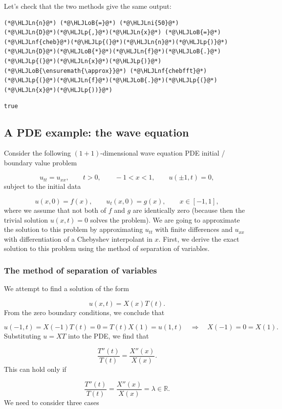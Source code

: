 \documentclass[12pt,a4paper]{article}
\newcommand{\HLJLn}[1]{#1}
\newcommand{\HLJLnf}[1]{\textcolor[RGB]{66,102,213}{#1}}
\newcommand{\HLJLni}[1]{\textcolor[RGB]{59,151,46}{#1}}
\newcommand{\HLJLoB}[1]{\textcolor[RGB]{102,102,102}{\textbf{#1}}}
\newcommand{\HLJLp}[1]{#1}
\begin{document}
Let's check that the two methods give the same output:


\begin{lstlisting}
(*@\HLJLn{n}@*) (*@\HLJLoB{=}@*) (*@\HLJLni{50}@*)
(*@\HLJLn{D}@*)(*@\HLJLp{,}@*)(*@\HLJLn{x}@*) (*@\HLJLoB{=}@*) (*@\HLJLnf{cheb}@*)(*@\HLJLp{(}@*)(*@\HLJLn{n}@*)(*@\HLJLp{)}@*)
(*@\HLJLn{D}@*)(*@\HLJLoB{*}@*)(*@\HLJLn{f}@*)(*@\HLJLoB{.}@*)(*@\HLJLp{(}@*)(*@\HLJLn{x}@*)(*@\HLJLp{)}@*) (*@\HLJLoB{\ensuremath{\approx}}@*) (*@\HLJLnf{chebfft}@*)(*@\HLJLp{(}@*)(*@\HLJLn{f}@*)(*@\HLJLoB{.}@*)(*@\HLJLp{(}@*)(*@\HLJLn{x}@*)(*@\HLJLp{))}@*)
\end{lstlisting}

\begin{lstlisting}
true
\end{lstlisting}


\subsection{A PDE example: the wave equation}
Consider the following $(1+1)$-dimensional wave equation PDE initial / boundary value problem 

\[
u_{tt} = u_{xx}, \qquad t > 0, \qquad -1 < x < 1, \qquad u(\pm 1, t) = 0,
\]
subject to the initial data

\[
u(x,0) = f(x), \qquad u_t(x,0) = g(x), \qquad x \in [-1, 1],
\]
where we assume that not both of $f$ and $g$ are identically zero (because then the trivial solution $u(x,t) = 0$ solves the problem).  We are going to approximate the solution to this problem by approximating $u_{tt}$ with finite differences and $u_{xx}$ with differentiation of a Chebyshev interpolant in $x$. First, we derive the exact solution to this problem using the method of separation of variables. 

\subsubsection{The method of separation of variables}
We attempt to find a solution of the form

\[
u(x,t) = X(x)T(t).
\]
From the zero boundary conditions, we conclude that

\[
u(-1,t) = X(-1)T(t) = 0 = T(t)X(1) = u(1,t) \quad \Rightarrow \quad X(-1) = 0 = X(1).
\]
Substituting $u = XT$  into the PDE, we find that

\[
\frac{T''(t)}{T(t)} = \frac{X''(x)}{X(x)}. 
\]
This can hold only if 

\[
\frac{T''(t)}{T(t)} = \frac{X''(x)}{X(x)} = \lambda \in \mathbb{R}.
\]
We need to consider three cases
\end{document}
